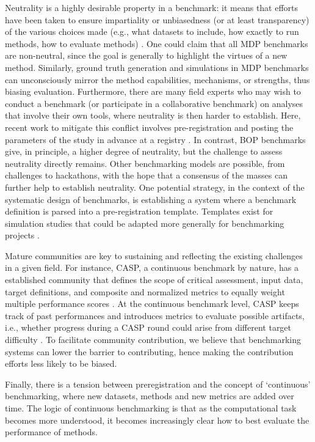 \documentclass[11pt]{article}
\begin{document}
Neutrality is a highly desirable property in a benchmark: it means that efforts have been taken to ensure impartiality or unbiasedness (or at least transparency) of the various choices made (e.g., what datasets to include, how exactly to run methods, how to evaluate methods) \cite{Weber2019-el, Jelizarow2010-kr}. One could claim that all MDP benchmarks are non-neutral, since the goal is generally to highlight the virtues of a new method. Similarly, ground truth generation and simulations in MDP benchmarks can unconsciously mirror the method capabilities, mechanisms, or strengths, thus biasing evaluation. Furthermore, there are many field experts who may wish to conduct a benchmark (or participate in a collaborative benchmark) on analyses that involve their own tools, where neutrality is then harder to establish. Here, recent work to mitigate this conflict involves pre-registration and posting the parameters of the study in advance at a registry \cite{Sullivan2019-wh, Olevska2021-if, Teo2024-wk}. In contrast, BOP benchmarks give, in principle, a higher degree of neutrality, but the challenge to assess neutrality directly remains. Other benchmarking models are possible, from challenges to hackathons, with the hope that a consensus of the masses can further help to establish neutrality. One potential strategy, in the context of the systematic design of benchmarks, is establishing a system where a benchmark definition is parsed into a pre-registration template. Templates exist for simulation studies that could be adapted more generally for benchmarking projects \cite{Siepe2023-tz}. 

Mature communities are key to sustaining and reflecting the existing challenges in a given field. For instance, CASP, a continuous benchmark by nature, has a established community that defines the scope of critical assessment, input data, target definitions, and composite and normalized metrics to equally weight multiple performance scores \cite{simpkin2023tertiary}. At the continuous benchmark level, CASP keeps track of past performances and introduces metrics to evaluate possible artifacts, i.e., whether progress during a CASP round could arise from different target difficulty \cite{kryshtafovych2019critical}. To facilitate community contribution, we believe that benchmarking systems can lower the barrier to contributing, hence making the contribution efforts less likely to be biased. 


Finally, there is a tension between preregistration and the concept of `continuous' benchmarking, where new datasets, methods and new metrics are added over time. The logic of continuous benchmarking is that as the computational task becomes more understood, it becomes increasingly clear how to best evaluate the performance of methods. 
\end{document}
